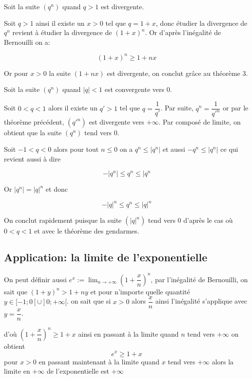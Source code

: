 \documentclass[french]{book}
\newcommand{\se}{\geq}
\newcommand{\ie}{\leq}
\newcommand{\limn}{\lim_{n\rightarrow +\infty}}
\begin{document}
\begin{thm}
Soit la suite $(q^n)$ quand $q>1$ est divergente.
\end{thm}

\begin{demo}
Soit $q>1$ ainsi il existe un $x>0$ tel que $q= 1+x$, donc étudier la divergence de $q^n$ revient à étudier la divergence de $(1+x)^n$. Or d'après l'inégalité de Bernouilli  on a:

$$(1+x)^n\se 1+nx $$

Or pour $x>0$ la suite $(1+nx)$ est divergente, on conclut grâce au théorème 3.

\end{demo}

\begin{thm}
Soit la suite $(q^n)$ quand $\vert q \vert <1$ est convergente vers 0.
\end{thm}

\begin{demo}
Soit $0<q<1$ alors il existe un $q'>1$ tel que $q=\dfrac{1}{q'}$. Par suite, $q^n=\dfrac{1}{q'^n}$ or par le théorème précédent, $(q'^n)$ est divergente vers $+ \infty$. Par composé de limite, on obtient que la suite $(q^n)$ tend vers $0$.

Soit $-1<q<0$ alors pour tout $n \ie 0$ on a $q^n\ie \vert q^n \vert $ et aussi $-q^n\ie \vert q^n \vert $ ce qui revient aussi à dire

$$ - \vert q^n \vert \ie q^n \ie \vert q^n$$

 Or $\vert q^n \vert = \vert q \vert^n$ et donc 
 
 $$-  \vert q \vert^n \ie q^n \ie \vert q \vert^n$$
 
 On conclut rapidement puisque la suite $(\vert q \vert^n)$ tend vers 0 d'après le cas où  $0<q<1$ et avec le théorème des gendarmes.

\end{demo}


\subsection{Application: la limite de l'exponentielle}

On peut définir aussi $e^x:=  \limn (1+\dfrac{x}{n})^n$, par l'inégalité de Bernouilli, on sait que 
$(1+y)^n>1+ny$ et pour n'importe quelle quantité $y \in [-1;0[ \cup ]0;+ \infty[ $. on sait que si $x>0$ alors $\dfrac{x}{n}$ ainsi l'inégalité s'applique avec $y=\dfrac{x}{n}$.

d'où $(1+\dfrac{x}{n})^n \se 1+x$ ainsi en passant à la limite quand $n$ tend vers $+ \infty$ on obtient 
$$e^x \se 1+x$$  pour $x>0$
en passant maintenant à la limite quand $x$ tend vers $ + \infty$ alors la limite en $+ \infty$ de l'exponentielle est $+ \infty$
\end{document}
